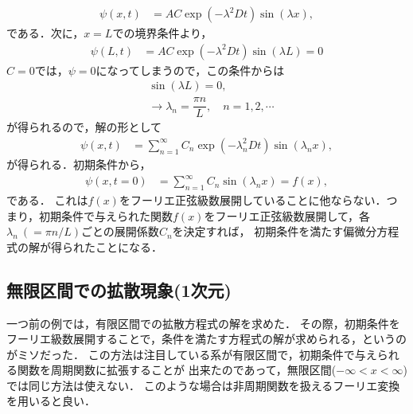 \begin{align}
\psi\left(x,t\right) & =AC\exp\left(-\lambda^{2}Dt\right)\sin\left(\lambda x\right),
\end{align}
である．次に，$x=L$での境界条件より，
\begin{align}
\psi\left(L,t\right) & =AC\exp\left(-\lambda^{2}Dt\right)\sin\left(\lambda L\right)=0
\end{align}
$C=0$では，$\psi=0$になってしまうので，この条件からは
\begin{align}
 & \sin\left(\lambda L\right)=0,\\
 & \to\lambda_{n}=\dfrac{\pi n}{L},\quad n=1,2,\cdots
\end{align}
が得られるので，解の形として
\begin{align}
\psi\left(x,t\right) & =\sum_{n=1}^{\infty}C_{n}\exp\left(-\lambda_{n}^{2}Dt\right)\sin\left(\lambda_{n}x\right),
\end{align}
が得られる．初期条件から，
\begin{align}
\psi\left(x,t=0\right) & =\sum_{n=1}^{\infty}C_{n}\sin\left(\lambda_{n}x\right)=f\left(x\right),
\end{align}
である．
これは$f\left(x\right)$をフーリエ正弦級数展開していることに他ならない．つまり，初期条件で与えられた関数$f\left(x\right)$をフーリエ正弦級数展開して，各$\lambda_{n}~(=\pi n/L)$ごとの展開係数$C_{n}$を決定すれば，
初期条件を満たす偏微分方程式の解が得られたことになる．
%
\subsection{無限区間での拡散現象(1次元)}
%
一つ前の例では，有限区間での拡散方程式の解を求めた．
その際，初期条件をフーリエ級数展開することで，条件を満たす方程式の解が求められる，というのがミソだった．
この方法は注目している系が有限区間で，初期条件で与えられる関数を周期関数に拡張することが
出来たのであって，無限区間($-\infty < x < \infty$)では同じ方法は使えない．
このような場合は非周期関数を扱えるフーリエ変換を用いると良い．

